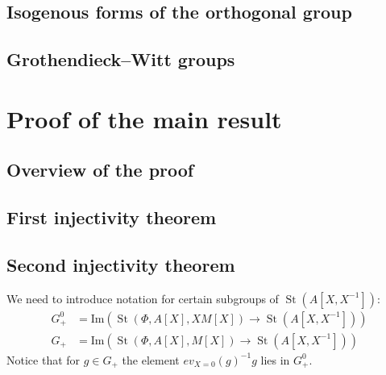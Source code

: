 \documentclass[oneside, 10pt]{amsart}
\theoremstyle{remark}
\theoremstyle{definition}
\DeclareMathOperator{\St}{St}
\numberwithin{equation}{section}
\begin{document}
\begin{comment}
Suppose for a moment that $\langle \alpha, \beta \rangle = -1$ and  $\langle \beta, \alpha \rangle = -1$ then
\[ \{s, t^{-1} \} = \{s,  t^{-1}\}_\alpha = \{t, s^{-1} \}_\beta^{-1} = \{s^{-1}, t\} \]
In particular, $\{s, s^{-1}\} = \{s, s^{-1}\}^{-1}$ 
\end{comment}

\subsection{Isogenous forms of the orthogonal group}
\subsection{Grothendieck--Witt groups}
\section{Proof of the main result}
\subsection{Overview of the proof}
\subsection{First injectivity theorem}
\subsection{Second injectivity theorem}

\begin{comment}
\[x_{\alpha}(aX^{-1}) x_{-\alpha}(mX) x_{\alpha}(-a(1+am)^{-1}X^{-1}) \cdot \{X, 1+am\} \in G_+.\]
$y := x_{\alpha}(aX^{-1}) x_{-\alpha}(mX) x_{\alpha}(-a(1+am)^{-1}X^{-1})$, 
$z = x_{-\alpha}(-m(1+am)^{-1}X) y h_{\alpha}((1+am)^{-1})$,
Using $\pi(z) = 1$ we get 
\begin{multline}z = z^{h_{ik}^{-1}(X)} = \\ x_{ji}(-m(1+am)^{-1}) x_{ij}(a) x_{ji}(m) \cdot x_{ij}(-a(1+am)^{-1})\{X, (1+am)^{-1}\} \cdot h_{ij}((1+am)^{-1}) \in G. \end{multline}
\end{comment}

We need to introduce notation for certain subgroups of $\St(A[X, X^{-1}])$:
\begin{align}
 G_+^0 & = \mathrm{Im}(\St(\Phi, A[X], XM[X]) \to \St(A[X, X^{-1}]))\\
 G_+   & = \mathrm{Im}(\St(\Phi, A[X], M[X]) \to \St(A[X, X^{-1}]))
\end{align}
Notice that for $ g\in G_+$ the element $ev_{X=0}(g)^{-1}g$ lies in $G_+^0$.
\end{document}
